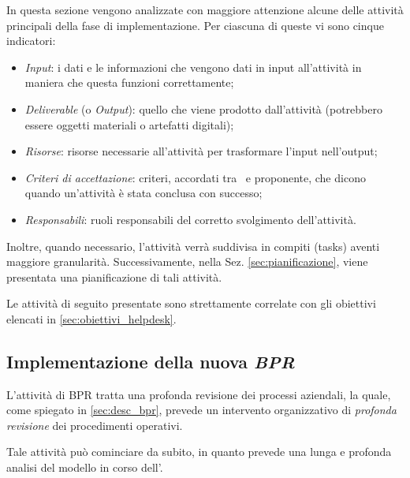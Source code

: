 	In questa sezione vengono analizzate con maggiore attenzione alcune delle attività principali della fase di implementazione.
	Per ciascuna di queste vi sono cinque indicatori:
	\begin{itemize}[noitemsep]
		\renewcommand\labelitemi{--}

		\item \textit{Input}: i dati e le informazioni che vengono dati in input all'attività in maniera che questa funzioni correttamente;

		\item \textit{Deliverable} (o \textit{Output}): quello che viene prodotto dall'attività (potrebbero essere oggetti materiali o artefatti digitali);

		\item \textit{Risorse}: risorse necessarie all'attività per trasformare l'input nell'output;

		\item \textit{Criteri di accettazione}: criteri, accordati tra \azienda~e proponente, che dicono quando un'attività è stata conclusa con successo; 

		\item \textit{Responsabili}: ruoli responsabili del corretto svolgimento dell'attività.
		
	\end{itemize}

	Inoltre, quando necessario, l'attività verrà suddivisa in compiti (tasks) aventi maggiore granularità.
	Successivamente, nella Sez. \ref{sec:pianificazione}, viene presentata una pianificazione di tali attività.
	
	Le attività di seguito presentate sono strettamente correlate con gli obiettivi elencati in \ref{sec:obiettivi_helpdesk}.
	
	\subsection{Implementazione della nuova \textit{BPR}}\label{subsec:bpr_implmentation}

		L'attività di BPR tratta una profonda revisione dei processi aziendali, la quale, come spiegato in \ref{sec:desc_bpr}, prevede un intervento organizzativo di \textit{profonda revisione} dei procedimenti operativi.
		
		Tale attività può cominciare da subito, in quanto prevede una lunga e profonda analisi del modello in corso dell'\istituto.
		
